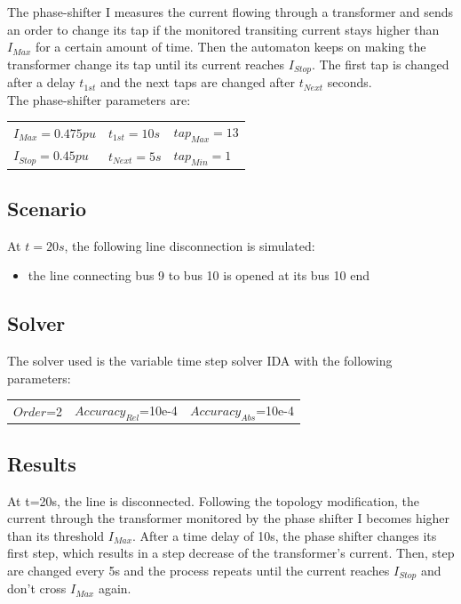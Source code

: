 \documentclass[a4paper, 12pt]{report}
\begin{document}
The phase-shifter I measures the current flowing through a transformer and sends an order to change its tap if the monitored transiting current stays higher than $I_{Max}$ for a certain amount of time. Then the automaton keeps on making the transformer change its tap until its current reaches $I_{Stop}$. The first tap is changed after a delay $t_{1st}$ and the next taps are changed after $t_{Next}$ seconds. \\

The phase-shifter parameters are:
\begin{center}
\begin{tabular}{l|l|l}
   $I_{Max}=0.475pu$ & $t_{1st}=10s$ & $tap_{Max}=13$ \\
   $I_{Stop}=0.45pu$  & $t_{Next}=5s$ & $tap_{Min}=1$ \\
\end{tabular}
\end{center}

\subsection{Scenario}
At $t=20s$, the following line disconnection is simulated:
\begin{itemize}
\item{the line connecting bus 9 to bus 10 is opened at its bus 10 end}
\end{itemize}

\subsection{Solver}
The solver used is the variable time step solver IDA with the following parameters:
\begin{center}
\begin{tabular}{l|l|l}
   $Order$=2 & $Accuracy_{Rel}$=10e-4 & $Accuracy_{Abs}$=10e-4 \\
\end{tabular}
\end{center}

\newpage
\subsection{Results}

At t=20s, the line is disconnected. Following the topology modification, the current through the transformer monitored by the phase shifter I becomes higher than its threshold $I_{Max}$. After a time delay of 10s, the phase shifter changes its first step, which results in a step decrease of the transformer's current. Then, step are changed every 5s and the process repeats until the current reaches $I_{Stop}$ and don't cross $I_{Max}$ again. \\
\end{document}
